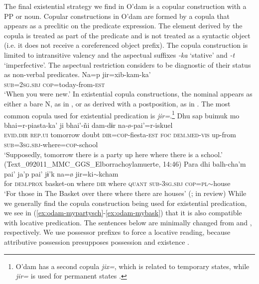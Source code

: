 \documentclass[output=paper]{langsci/langscibook}
\begin{document}
The final existential strategy we find in O’dam is a copular construction with a PP or noun. Copular constructions in O'dam are formed by a copula that appears as a preclitic on the predicate expression. The element derived by the copula is treated as part of the predicate and is not treated as a syntactic object (i.e. it does not receive a coreferenced object prefix). The copula construction is limited to intransitive valency and the aspectual suffixes \emph{-ka} `stative' and \emph{-t} `imperfective'. The aspectual restriction \citet[88ff]{garcia2014} considers to be diagnostic of their status as non-verbal predicates.
\ea
\label{ex:odam-copconst}
\gll Na=p jir={\ob}xib-kam{\cb}-ka'\\
\textsc{sub=2sg.sbj} \textsc{cop}=today-from-\textsc{est}\\
\glt `When you were new.' \citep[89]{garcia2014}
\z
In existential copula constructions, the nominal appears as either a bare N, as in , or as derived with a postposition, as in . The most common copula used for existential predication is \emph{jir=}.\footnote{O’dam has a second copula \emph{jix=}, which is related to temporary states, while \emph{jir=} is used for permanent states \citep{martinez2016}.}
\ea
\label{ex:odam-partysch}
\gll Dhu 		sap 		buimuk 	mo 	bhai=r-piasta-ka’ ji 	bhai’-ñi 	dam-dɨr 		na-\o-pai’=r-iskuel\\
\textsc{evid.dir} 	\textsc{rep.ui} 	tomorrow 	doubt 	\textsc{dir=cop}-fiesta-\textsc{est} \textsc{foc} 	\textsc{dem.med-vis} 	up-from		\textsc{sub=3sg.sbj}-where=\textsc{cop}-school\\
\glt ‘Supposedly, tomorrow there is a party up here where there is a school.’ (Text\_092011\_MMC\_GGS\_Elborrachoylamuerte, 14:46)
\z 
\ea
\label{ex:odam-thebask}
\gll Para 	dhi 	balh-cha'm     		pai'  	ja'p 	pai'    	jɨ'k 	{na=\o}	{jir=ki$\sim$kcham}\\
	for  	\textsc{dem.prox} 	basket-on 	where 	\textsc{dir} 	where  \textsc{quant} 	\textsc{sub-3sg.sbj} 	\textsc{cop=pl}$\sim$house\\
\glt ‘For those in The Basket over there where there are houses’ (\citeauthor{garciaeinrev}; in review)
\z 
While we generally find the copula construction being used for existential predication, we see in (\ref{ex:odam-mypartysch}-\ref{ex:odam-mybask}) that it is also compatible with locative predication. The sentences below are minimally changed from  and , respectively. We use possessor prefixes to force a locative reading, because attributive possession presupposes possession and existence \citep{mithun2001}.
\end{document}

